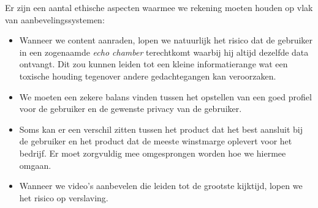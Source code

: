 Er zijn een aantal ethische aspecten waarmee we rekening moeten houden op vlak van aanbevelingssystemen: 
\begin{itemize}
	\item Wanneer we content aanraden, lopen we natuurlijk het risico dat de gebruiker in een zogenaamde \textit{echo chamber} terechtkomt waarbij hij altijd dezelfde data ontvangt. Dit zou kunnen leiden tot een kleine informatierange wat een toxische houding tegenover andere gedachtegangen kan veroorzaken.
	\item We moeten een zekere balans vinden tussen het opstellen van een goed profiel voor de gebruiker en de gewenste privacy van de gebruiker.
	\item Soms kan er een verschil zitten tussen het product dat het best aansluit bij de gebruiker en het product dat de meeste winstmarge oplevert voor het bedrijf. Er moet zorgvuldig mee omgesprongen worden hoe we hiermee omgaan.
	\item Wanneer we video's aanbevelen die leiden tot de grootste kijktijd, lopen we het risico op verslaving.
\end{itemize}

